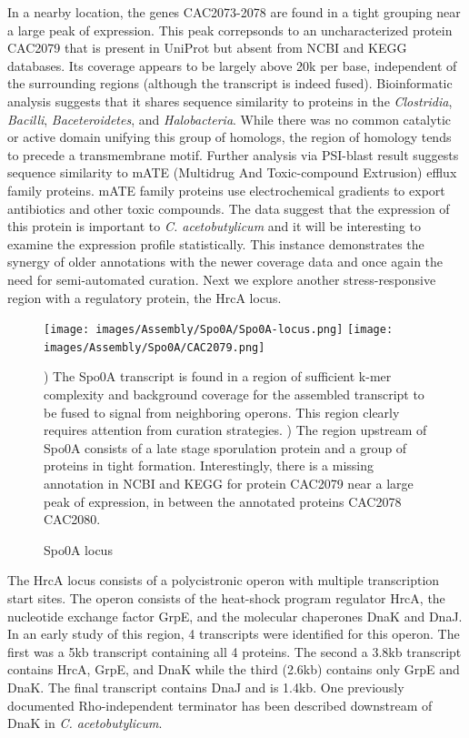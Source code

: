In a nearby location, the genes CAC2073-2078 are found in a tight grouping near a large peak of expression. This peak correpsonds to an uncharacterized protein CAC2079 that is present in UniProt but absent from NCBI and KEGG databases. Its coverage appears to be largely above 20k per base, independent of the surrounding regions (although the transcript is indeed fused). Bioinformatic analysis suggests that it shares sequence similarity to proteins in the \textit{Clostridia}, \textit{Bacilli}, \textit{Baceteroidetes}, and \textit{Halobacteria}. While there was no common catalytic or active domain unifying this group of homologs, the region of homology tends to precede a transmembrane motif. Further analysis via PSI-blast result suggests sequence similarity to mATE (Multidrug And Toxic-compound Extrusion) efflux family proteins. mATE family proteins use electrochemical gradients to export antibiotics and other toxic compounds. The data suggest that the expression of this protein is important to \textit{C. acetobutylicum} and it will be interesting to examine the expression profile statistically. This instance demonstrates the synergy of older annotations with the newer coverage data and once again the need for semi-automated curation. Next we explore another stress-responsive region with a regulatory protein, the HrcA locus.

\begin{figure}
\small
{\texttt{[image: images/Assembly/Spo0A/Spo0A-locus.png]}
\label{fig:6a}}
{\texttt{[image: images/Assembly/Spo0A/CAC2079.png]}
\label{fig:6b}}

\caption{Spo0A locus}
) The Spo0A transcript is found in a region of sufficient k-mer complexity and background coverage for the assembled transcript to be fused to signal from neighboring operons. This region clearly requires attention from curation strategies. ) The region upstream of Spo0A consists of a late stage sporulation protein and a group of proteins in tight formation. Interestingly, there is a missing annotation in NCBI and KEGG for protein CAC2079 near a large peak of expression, in between the annotated proteins CAC2078 CAC2080.
\end{figure}

The HrcA locus consists of a polycistronic operon with multiple transcription start sites. The operon consists of the heat-shock program regulator HrcA, the nucleotide exchange factor GrpE, and the molecular chaperones DnaK and DnaJ. In an early study of this region, 4 transcripts were identified for this operon. The first was a 5kb transcript containing all 4 proteins. The second a 3.8kb transcript contains HrcA, GrpE, and DnaK while the third (2.6kb) contains only GrpE and DnaK. The final transcript contains DnaJ and is 1.4kb. One previously documented Rho-independent terminator has been described downstream of DnaK in \textit{C. acetobutylicum}.

